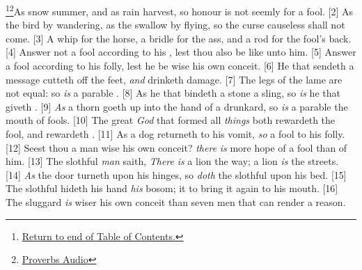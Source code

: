 \footnote{\textcolor[cmyk]{0.99998,1,0,0}{\hyperlink{TOC}{Return to end of Table of Contents.}}}\footnote{\href{https://audiobible.com/bible/proverbs_26.html}{\textcolor[cmyk]{0.99998,1,0,0}{Proverbs Audio}}}\textcolor[cmyk]{0.99998,1,0,0}{As snow  summer, and as rain  harvest, so honour is not seemly for a fool.}
[2] \textcolor[cmyk]{0.99998,1,0,0}{As the bird by wandering, as the swallow by flying, so the curse causeless shall not come.}
[3] \textcolor[cmyk]{0.99998,1,0,0}{A whip for the horse, a bridle for the ass, and a rod for the fool's back.}
[4] \textcolor[cmyk]{0.99998,1,0,0}{Answer not a fool according to his , lest thou also be like unto him.}
[5] \textcolor[cmyk]{0.99998,1,0,0}{Answer a fool according to his folly, lest he be wise  his own conceit.}
[6] \textcolor[cmyk]{0.99998,1,0,0}{He that sendeth a message  cutteth off the feet, \emph{and} drinketh damage.}
[7] \textcolor[cmyk]{0.99998,1,0,0}{The legs of the lame are not equal: so \emph{is} a parable  .}
[8] \textcolor[cmyk]{0.99998,1,0,0}{As he that bindeth a stone  a sling, so \emph{is} he that giveth .}
[9] \textcolor[cmyk]{0.99998,1,0,0}{\emph{As} a thorn goeth up into the hand of a drunkard, so \emph{is} a parable  the mouth of fools.}
[10] \textcolor[cmyk]{0.99998,1,0,0}{The great \emph{God} that formed all \emph{things} both rewardeth the fool, and rewardeth .}
[11] \textcolor[cmyk]{0.99998,1,0,0}{As a dog returneth to his vomit, \emph{so} a fool  to his folly.}
[12] \textcolor[cmyk]{0.99998,1,0,0}{Seest thou a man wise  his own conceit? \emph{there} \emph{is} more hope of a fool than of him.}
[13] \textcolor[cmyk]{0.99998,1,0,0}{The slothful \emph{man} saith, \emph{There} \emph{is} a lion  the way; a lion \emph{is}  the streets.}
[14] \textcolor[cmyk]{0.99998,1,0,0}{\emph{As} the door turneth upon his hinges, so \emph{doth} the slothful upon his bed.}
[15] \textcolor[cmyk]{0.99998,1,0,0}{The slothful hideth his hand  \emph{his} bosom; it  to bring it again to his mouth.}
[16] \textcolor[cmyk]{0.99998,1,0,0}{The sluggard \emph{is} wiser  his own conceit than seven men that can render a reason.}
